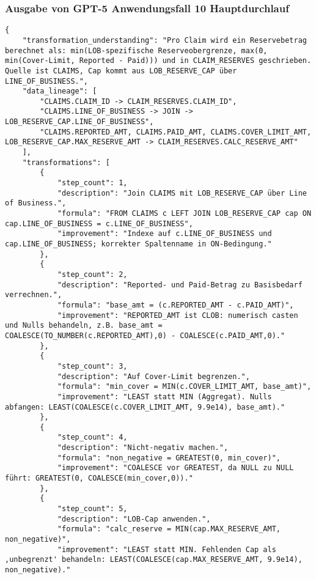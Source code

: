 \subsubsection{Ausgabe von GPT-5 Anwendungsfall 10 Hauptdurchlauf}\label{anhang:subsubsec:gpt_case10_prompt1}
\begin{lstlisting}[caption={Ausgabe: GPT-5 Anwendungsfall 10 Hauptdurchlauf},label={gpt_case10_prompt1}]
{
    "transformation_understanding": "Pro Claim wird ein Reservebetrag berechnet als: min(LOB-spezifische Reserveobergrenze, max(0, min(Cover-Limit, Reported - Paid))) und in CLAIM_RESERVES geschrieben. Quelle ist CLAIMS, Cap kommt aus LOB_RESERVE_CAP über LINE_OF_BUSINESS.",
    "data_lineage": [
        "CLAIMS.CLAIM_ID -> CLAIM_RESERVES.CLAIM_ID",
        "CLAIMS.LINE_OF_BUSINESS -> JOIN -> LOB_RESERVE_CAP.LINE_OF_BUSINESS",
        "CLAIMS.REPORTED_AMT, CLAIMS.PAID_AMT, CLAIMS.COVER_LIMIT_AMT, LOB_RESERVE_CAP.MAX_RESERVE_AMT -> CLAIM_RESERVES.CALC_RESERVE_AMT"
    ],
    "transformations": [
        {
            "step_count": 1,
            "description": "Join CLAIMS mit LOB_RESERVE_CAP über Line of Business.",
            "formula": "FROM CLAIMS c LEFT JOIN LOB_RESERVE_CAP cap ON cap.LINE_OF_BUSINESS = c.LINE_OF_BUSINESS",
            "improvement": "Indexe auf c.LINE_OF_BUSINESS und cap.LINE_OF_BUSINESS; korrekter Spaltenname in ON-Bedingung."
        },
        {
            "step_count": 2,
            "description": "Reported- und Paid-Betrag zu Basisbedarf verrechnen.",
            "formula": "base_amt = (c.REPORTED_AMT - c.PAID_AMT)",
            "improvement": "REPORTED_AMT ist CLOB: numerisch casten und Nulls behandeln, z.B. base_amt = COALESCE(TO_NUMBER(c.REPORTED_AMT),0) - COALESCE(c.PAID_AMT,0)."
        },
        {
            "step_count": 3,
            "description": "Auf Cover-Limit begrenzen.",
            "formula": "min_cover = MIN(c.COVER_LIMIT_AMT, base_amt)",
            "improvement": "LEAST statt MIN (Aggregat). Nulls abfangen: LEAST(COALESCE(c.COVER_LIMIT_AMT, 9.9e14), base_amt)."
        },
        {
            "step_count": 4,
            "description": "Nicht-negativ machen.",
            "formula": "non_negative = GREATEST(0, min_cover)",
            "improvement": "COALESCE vor GREATEST, da NULL zu NULL führt: GREATEST(0, COALESCE(min_cover,0))."
        },
        {
            "step_count": 5,
            "description": "LOB-Cap anwenden.",
            "formula": "calc_reserve = MIN(cap.MAX_RESERVE_AMT, non_negative)",
            "improvement": "LEAST statt MIN. Fehlenden Cap als ,unbegrenzt' behandeln: LEAST(COALESCE(cap.MAX_RESERVE_AMT, 9.9e14), non_negative)."

\end{lstlisting}
